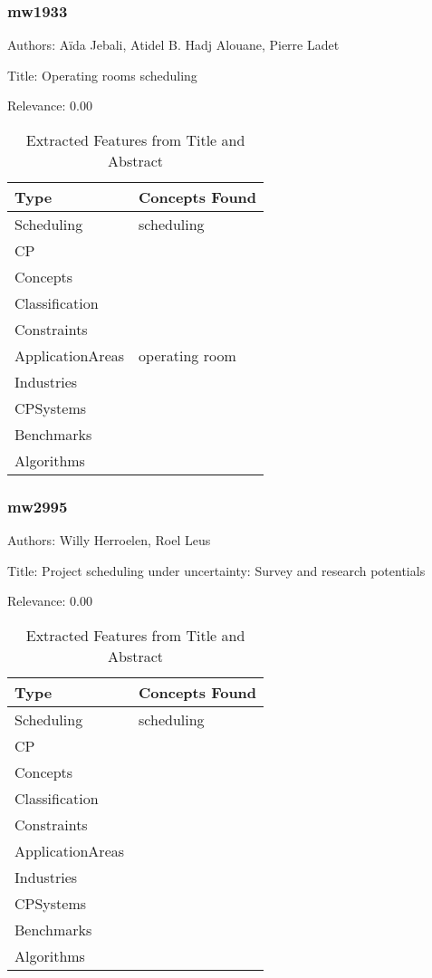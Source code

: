 \subsubsection{mw1933}
\label{mw:mw1933}

Authors: Aïda Jebali, Atidel B. Hadj Alouane, Pierre Ladet

Title: Operating rooms scheduling

Relevance:  0.00

{\scriptsize
\begin{longtable}{p{2cm}p{20cm}}
\caption{Extracted Features from Title and Abstract}\\ \toprule
Type & Concepts Found\\ \midrule
\endhead
\bottomrule
\endfoot
Scheduling & scheduling\\ 
CP & \\ 
Concepts & \\ 
Classification & \\ 
Constraints & \\ 
ApplicationAreas & operating room\\ 
Industries & \\ 
CPSystems & \\ 
Benchmarks & \\ 
Algorithms & \\ 
\end{longtable}
}



\subsubsection{mw2995}
\label{mw:mw2995}

Authors: Willy Herroelen, Roel Leus

Title: Project scheduling under uncertainty: Survey and research potentials

Relevance:  0.00

{\scriptsize
\begin{longtable}{p{2cm}p{20cm}}
\caption{Extracted Features from Title and Abstract}\\ \toprule
Type & Concepts Found\\ \midrule
\endhead
\bottomrule
\endfoot
Scheduling & scheduling\\ 
CP & \\ 
Concepts & \\ 
Classification & \\ 
Constraints & \\ 
ApplicationAreas & \\ 
Industries & \\ 
CPSystems & \\ 
Benchmarks & \\ 
Algorithms & \\ 
\end{longtable}
}



